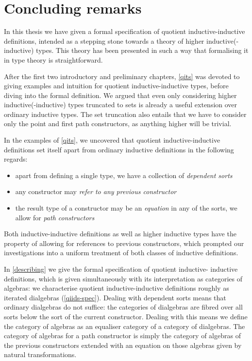 \chapter{Concluding remarks}
\label{conclusion}

In this thesis we have given a formal specification of quotient
inductive-inductive definitions, intended as a stepping stone towards
a theory of higher inductive(-inductive) types. This theory has been
presented in such a way that formalising it in type theory is
straightforward.

After the first two introductory and preliminary chapters, \cref{qits}
was devoted to giving examples and intuition for quotient
inductive-inductive types, before diving into the formal
definition. We argued that even only considering higher
inductive(-inductive) types truncated to sets is already a useful
extension over ordinary inductive types. The set truncation also
entails that we have to consider only the point and first path
constructors, as anything higher will be trivial. 

In the examples of \cref{qits}, we uncovered that quotient
inductive-inductive definitions set itself apart from ordinary
inductive definitions in the following regards:
%
\begin{itemize}
\item apart from defining a single type, we have a collection of \emph{dependent sorts}
\item any constructor may \emph{refer to any previous constructor}
\item the result type of a constructor may be an \emph{equation} in
  any of the sorts, \ie we allow for \emph{path constructors}
\end{itemize}
%
Both inductive-inductive definitions as well as higher inductive types
have the property of allowing for references to previous constructors,
which prompted our investigations into a uniform treatment of both
classes of inductive definitions.

In \cref{describing} we give the formal specification of quotient
inductive- inductive definitions, which is given simultaneously with
its interpretation as categories of algebras: we characterise quotient
inductive-inductive definitions roughly as iterated dialgebras
(\cref{qiids-spec}). Dealing with dependent sorts means that ordinary
dialgebras do not suffice: the categories of dialgebras are fibred
over all sorts below the sort of the current constructor. Dealing with
this means we define the category of algebras as an equaliser category
of a category of dialgebras. The category of algebras for a path
constructor is simply the category of algebras of the previous
constructors extended with an equation on those algebras given by
natural transformations.


